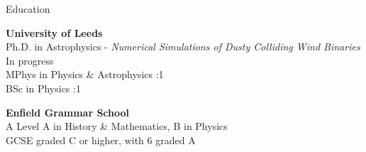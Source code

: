 \documentclass{resume} %
\begin{document}
\begin{rSection}{Education}

{\bf University of Leeds}  \\ 
Ph.D. in Astrophysics - {\em Numerical Simulations of Dusty Colliding Wind Binaries} \dotfill In progress \\
MPhys in Physics \& Astrophysics :1 \\
BSc in Physics :1

{\bf Enfield Grammar School}  \\
A Level \dotfill A in History \& Mathematics, B in Physics \\
GCSE  graded C or higher, with 6 graded A

\end{rSection}
\end{document}
